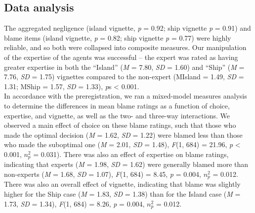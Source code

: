 \documentclass[
  man,floatsintext]{apa6}
\begin{document}
\hypertarget{data-analysis}{%
\subsection{Data analysis}\label{data-analysis}}

The aggregated negligence (island vignette, \emph{p} = 0.92; ship vignette \emph{p} = 0.91) and blame items (island vignette, \emph{p} = 0.82; ship vignette \emph{p} = 0.77) were highly reliable, and so both were collapsed into composite measures. Our manipulation of the expertise of the agents was successful -- the expert was rated as having greater expertise in both the ``Island'' (\emph{M} = 7.80, \emph{SD} = 1.60) and ``Ship'' (\emph{M} = 7.76, \emph{SD} = 1.75) vignettes compared to the non-expert (MIsland = 1.49, \emph{SD} = 1.31; MShip = 1.57, \emph{SD} = 1.33), \emph{p}s \textless{} 0.001.\\
In accordance with the preregistration, we ran a mixed-model measures analysis to determine the differences in mean blame ratings as a function of choice, expertise, and vignette, as well as the two- and three-way interactions. We observed a main effect of choice on these blame ratings, such that those who made the optimal decision (\emph{M} = 1.62, \emph{SD} = 1.22) were blamed less than those who made the suboptimal one (\emph{M} = 2.01, \emph{SD} = 1.48), \emph{F}(1, 684) = 21.96, \emph{p} \textless{} 0.001, \(n^2_p\) = 0.031). There was also an effect of expertise on blame ratings, indicating that experts (\emph{M} = 1.98, \emph{SD} = 1.62) were generally blamed more than non-experts (\emph{M} = 1.68, \emph{SD} = 1.07), \emph{F}(1, 684) = 8.45, \emph{p} = 0.004, \(n^2_p\) = 0.012. There was also an overall effect of vignette, indicating that blame was slightly higher for the Ship case (\emph{M} = 1.83, \emph{SD} = 1.38) than for the Island case (\emph{M} = 1.73, \emph{SD} = 1.34), \emph{F}(1, 684) = 8.26, \emph{p} = 0.004, \(n^2_p\) = 0.012.\\
\end{document}

